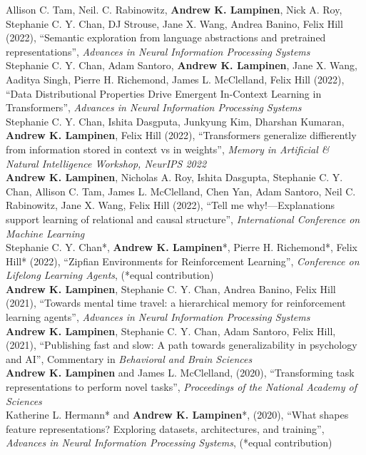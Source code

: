 \documentclass[margin]{res}
\begin{document}
\begin{resume}
Allison C. Tam,  Neil. C. Rabinowitz, \textbf{Andrew K. Lampinen}, Nick A. Roy, Stephanie C. Y. Chan, DJ Strouse, Jane X. Wang, Andrea Banino, Felix Hill (2022), {``Semantic exploration from language abstractions and pretrained representations'',} \textit{Advances in Neural Information Processing Systems} \\[3pt] 
Stephanie C. Y. Chan, Adam Santoro, \textbf{Andrew K. Lampinen}, Jane X. Wang, Aaditya Singh, Pierre H. Richemond, James L. McClelland, Felix Hill (2022), {``Data Distributional Properties Drive Emergent In-Context Learning in Transformers'',} \textit{Advances in Neural Information Processing Systems} \\[3pt] 
Stephanie C. Y. Chan, Ishita Dasgputa, Junkyung Kim, Dharshan Kumaran, \textbf{Andrew K. Lampinen}, Felix Hill (2022), {``Transformers generalize diffierently from information stored in context vs in weights'',} \textit{Memory in Artificial \& Natural Intelligence Workshop, NeurIPS 2022} \\[3pt]
\textbf{Andrew K. Lampinen}, Nicholas A. Roy, Ishita Dasgupta, Stephanie C. Y. Chan, Allison C. Tam, James L. McClelland, Chen Yan, Adam Santoro, Neil C. Rabinowitz, Jane X. Wang, Felix Hill (2022), {``Tell me why!---Explanations support learning of relational and causal structure'',} \textit{International Conference on Machine Learning} \\[3pt] 
Stephanie C. Y. Chan*, \textbf{Andrew K. Lampinen}*, Pierre H. Richemond*, Felix Hill* (2022), {``Zipfian Environments for Reinforcement Learning'',} \textit{Conference on Lifelong Learning Agents}, (*equal contribution) \\[3pt] 
\textbf{Andrew K. Lampinen}, Stephanie C. Y. Chan, Andrea Banino, Felix Hill (2021), {``Towards mental time travel: a hierarchical memory for reinforcement learning agents'',} \textit{Advances in Neural Information Processing Systems} \\[3pt] 
\textbf{Andrew K. Lampinen}, Stephanie C. Y. Chan, Adam Santoro, Felix Hill, (2021), {``Publishing fast and slow: A path towards generalizability in psychology and AI'',} Commentary in \textit{Behavioral and Brain Sciences} \\[3pt] 
\textbf{Andrew K. Lampinen} and James L. McClelland, (2020), {``Transforming task representations to perform novel tasks'',} \textit{Proceedings of the National Academy of Sciences} \\[3pt] 
Katherine L. Hermann* and \textbf{Andrew K. Lampinen}*, (2020), {``What shapes feature representations? Exploring datasets, architectures, and training'',} \textit{Advances in Neural Information Processing Systems}, (*equal contribution) \\[3pt] 

\end{resume}
\end{document}
